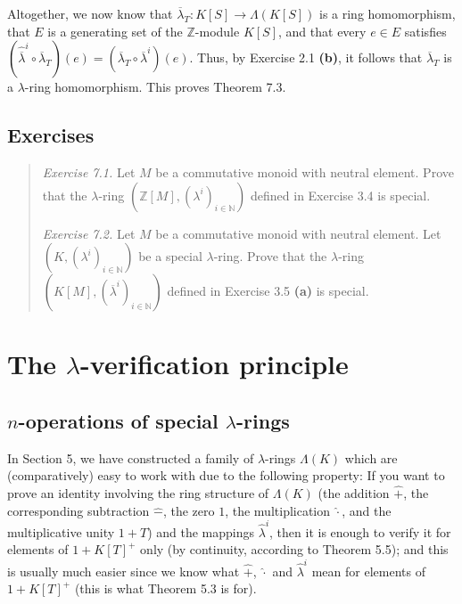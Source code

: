 \documentclass[numbers=enddot,12pt,final,onecolumn,notitlepage]{scrartcl}%
\begin{document}
Altogether, we now know that $\overline{\lambda}_{T}:K\left[  S\right]
\rightarrow\Lambda\left(  K\left[  S\right]  \right)  $ is a ring
homomorphism, that $E$ is a generating set of the $\mathbb{Z}$-module
$K\left[  S\right]  $, and that every $e\in E$ satisfies $\left(
\widehat{\overline{\lambda}}^{i}\circ\overline{\lambda}_{T}\right)  \left(
e\right)  =\left(  \overline{\lambda}_{T}\circ\overline{\lambda}^{i}\right)
\left(  e\right)  $. Thus, by Exercise 2.1 \textbf{(b)}, it follows that
$\overline{\lambda}_{T}$ is a $\lambda$-ring homomorphism. This proves Theorem 7.3.

\subsection{Exercises}

\begin{quotation}
\textit{Exercise 7.1.} Let $M$ be a commutative monoid with neutral element.
Prove that the $\lambda$-ring $\left(  \mathbb{Z}\left[  M\right]  ,\left(
\lambda^{i}\right)  _{i\in\mathbb{N}}\right)  $ defined in Exercise 3.4 is special.

\textit{Exercise 7.2.} Let $M$ be a commutative monoid with neutral element.
Let $\left(  K,\left(  \lambda^{i}\right)  _{i\in\mathbb{N}}\right)  $ be a
special $\lambda$-ring. Prove that the $\lambda$-ring $\left(  K\left[
M\right]  ,\left(  \overline{\lambda}^{i}\right)  _{i\in\mathbb{N}}\right)  $
defined in Exercise 3.5 \textbf{(a)} is special.
\end{quotation}

\section{The $\lambda$-verification principle}

\subsection{$n$-operations of special $\lambda$-rings}

In Section 5, we have constructed a family of $\lambda$-rings $\Lambda\left(
K\right)  $ which are (comparatively) easy to work with due to the following
property: If you want to prove an identity involving the ring structure of
$\Lambda\left(  K\right)  $ (the addition $\widehat{+}$, the corresponding
subtraction $\widehat{-}$, the zero $1$, the multiplication $\widehat{\cdot}$,
and the multiplicative unity $1+T$) and the mappings $\widehat{\lambda}^{i}$,
then it is enough to verify it for elements of $1+K\left[  T\right]  ^{+}$
only (by continuity, according to Theorem 5.5); and this is usually much
easier since we know what $\widehat{+}$, $\widehat{\cdot}$ and
$\widehat{\lambda}^{i}$ mean for elements of $1+K\left[  T\right]  ^{+}$ (this
is what Theorem 5.3 is for).
\end{document}
